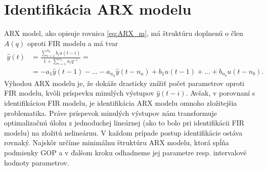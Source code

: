 \section{Identifikácia ARX modelu}
ARX model, ako opisuje rovnica \ref{eq:ARX_m}, má štruktúru doplnenú o člen $ A(q) $ oproti FIR modelu a má tvar
\begin{equation*}
	\begin{split}
		\hat{y}(t) &= \frac{\sum_{i=1}^{n_b} b_{i}u(t-i)}{1 + \sum_{i=1}^{n_a} a_{i}q^{-i}} =\\
		&= -a_{1}\hat{y}(t-1) - \dots -a_{n_a}\hat{y}(t-n_a) + b_{1}u(t-1) + \dots + b_{n_b}u(t-n_b).
	\end{split}
\end{equation*}
Výhodou ARX modelu je, že dokáže drasticky znížiť počet parametrov oproti FIR modelu, kvôli príspevku minulých výstupov $ \hat{y}(t-i) $. Avšak, v porovnaní s identifikáciou FIR modelu, je identifikácia ARX modelu omnoho zložitejšia problematika. Práve príspevok minulých výstupov nám transformuje optimalizačnú úlohu z jednoduchej lineárnej (ako to bolo pri identifikácii FIR modelu) na zložitú nelineárnu. V každom prípade postup identifikácie ostáva rovnaký. Najskôr určíme minimálnu štruktúru ARX modelu, ktorá spĺňa podmienky GOP a v ďalšom kroku odhadneme jej parametre resp. intervalové hodnoty parametrov. 

